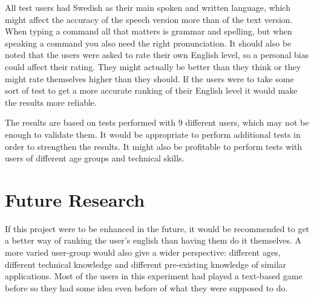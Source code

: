 All test users had Swedish as their main spoken and written language, which might affect the accuracy of the speech version more than of the text version. When typing a command all that matters is grammar and spelling, but when speaking a command you also need the right pronunciation. It should also be noted that the users were asked to rate their own English level, so a personal bias could affect their rating. They might actually be better than they think or they might rate themselves higher than they should. If the users were to take some sort of test to get a more accurate ranking of their English level it would make the results more reliable.

The results are based on tests performed with 9 different users, which may not be enough to validate them. It would be appropriate to perform additional tests in order to strengthen the results. It might also be profitable to perform tests with users of different age groups and technical skills.

\section{Future Research}
If this project were to be enhanced in the future, it would be recommended to get a better way of ranking the user's english than having them do it themselves. A more varied user-group would also give a wider perspective: different ages, different technical knowledge and different pre-existing knowledge of similar applications. Most of the users in this experiment had played a text-based game before so they had some idea even before of what they were supposed to do.